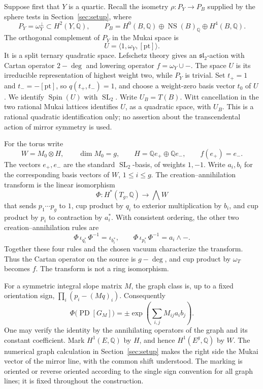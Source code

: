 \documentclass[11pt]{article}
\numberwithin{equation}{section}
\theoremstyle{definition}
\theoremstyle{remark}
\begin{document}
Suppose first that \(Y\) is a quartic.  Recall the isometry
\(\rho:P_Y\longrightarrow P_B\) supplied by the sphere tests in
Section~\ref{sec:setup}, where
\[
 P_Y=\omega_Y^\perp\subset H^2(Y,\mathbb Q),\qquad
 P_B=H^0(B,\mathbb Q)\oplus\operatorname{NS}(B)_\mathbb Q\oplus H^4(B,\mathbb Q).
\]
The orthogonal complement of \(P_Y\) in the Mukai space is
\[
 U=\langle 1,\omega_Y,[\mathrm{pt}]\rangle.
\]
It is a split ternary quadratic space.  Lefschetz theory gives an
\(\mathfrak{sl}_2\)-action with Cartan operator \(2-\deg\) and lowering
operator \(f=\omega_Y\cup-\).  The space \(U\) is its irreducible
representation of highest weight two, while \(P_Y\) is trivial.
Set \(t_+=1\) and \(t_-=-[\mathrm{pt}]\), so
\(q(t_+,t_-)=1\), and choose a weight-zero basis vector \(t_0\) of
\(U\).  We identify \(\operatorname{Spin}(U)\) with \(\operatorname{SL}_2\).
Write \(U_B=T(B)\).  Witt cancellation in the two rational Mukai lattices
identifies \(U\), as a quadratic space, with \(U_B\).
This is a rational quadratic identification only; no assertion about
the transcendental action of mirror symmetry is used.

For the torus write
\[
 W=M_0\otimes H,\qquad \dim M_0=g,\qquad
 H=\mathbb Q e_+\oplus\mathbb Q e_-,\qquad f(e_+)=e_-.
\]
The vectors \(e_+,e_-\) are the standard \(\operatorname{SL}_2\)-basis, of weights
\(1,-1\).  Write \(a_i,b_i\) for the corresponding basis vectors of
\(W\), \(1\le i\le g\).  The creation--annihilation transform is the
linear isomorphism
\begin{equation}\label{coh:transform}
 \Phi:H^*(T_g,\mathbb Q)\longrightarrow\bigwedge W
\end{equation}
that sends \(p_1\cdots p_g\) to \(1\), cup product by \(q_i\) to
exterior multiplication by \(b_i\), and cup product by \(p_i\) to
contraction by \(a_i^*\).  With consistent ordering, the other two
creation--annihilation rules are
\[
 \Phi\,\iota_{q_i^*}\,\Phi^{-1}=\iota_{b_i^*},
 \qquad
 \Phi\,\iota_{p_i^*}\,\Phi^{-1}=a_i\wedge-.
\]
Together these four rules and the chosen vacuum characterize the
transform.  Thus the Cartan
operator on the source is \(g-\deg\), and cup product by
\(\omega_T\) becomes \(f\).  The transform is not a ring isomorphism.

For a symmetric integral slope matrix \(M\), the graph class is, up
to a fixed orientation sign, \(\prod_i(p_i-(Mq)_i)\).  Consequently
\begin{equation}\label{coh:graph-exponential}
 \Phi\bigl(\operatorname{PD}[G_M]\bigr)
 =\pm\exp\left(\sum_{i,j}M_{ij}a_i b_j\right).
\end{equation}
One may verify the identity by the annihilating operators of the graph
and its constant coefficient.  Mark \(H^1(E,\mathbb Q)\) by \(H\), and hence
\(H^1(E^g,\mathbb Q)\) by \(W\).  The numerical graph calculation in
Section~\ref{sec:setup} makes the right side the Mukai vector of the
mirror line, with the common shift understood.  The marking is oriented
or reverse oriented according to the single sign convention for all
graph lines; it is fixed throughout the construction.
\end{document}
